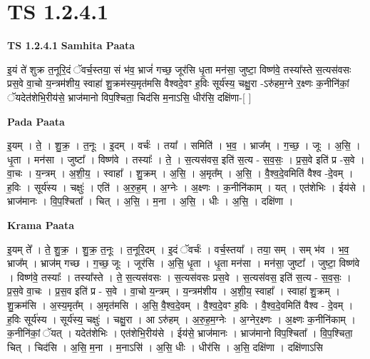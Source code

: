 \documentclass[17pt]{extarticle}
\begin{document}
\section*{ TS 1.2.4.1 }

\textbf{TS 1.2.4.1 } \newline
\textbf{Samhita Paata} \newline

इ॒यं ते॑ शुक्र त॒नूरि॒दं ॅवर्च॒स्तया॒ सं भ॑व॒ भ्राजं॑ गच्छ॒ जूर॑सि धृ॒ता मन॑सा॒ जुष्टा॒ विष्ण॑वे॒ तस्या᳚स्ते स॒त्यस॑वसः प्रस॒वे वा॒चो य॒न्त्रम॑शीय॒ स्वाहा॑ शु॒क्रम॑स्य॒मृत॑मसि वैश्वदे॒वꣳ ह॒विः सूर्य॑स्य॒ चक्षु॒रा -ऽरु॑हम॒ग्ने र॒क्ष्णः क॒नीनि॑कां॒ ॅयदेत॑शेभि॒रीय॑से॒ भ्राज॑मानो विप॒श्चिता॒ चिद॑सि म॒नाऽसि॒ धीर॑सि॒ दक्षि॑णा-[ ] \newline

\textbf{Pada Paata} \newline

इ॒यम् । ते॒ । शु॒क्र॒ । त॒नूः । इ॒दम् । वर्चः॑ । तया᳚ । समिति॑ । भ॒व॒ । भ्राज᳚म् । ग॒च्छ॒ । जूः । अ॒सि॒ । धृ॒ता । मन॑सा । जुष्टा᳚ । विष्ण॑वे । तस्याः᳚ । ते॒ । स॒त्यस॑वस॒ इति॑ स॒त्य - स॒व॒सः॒ । प्र॒स॒वे इति॑ प्र -स॒वे । वा॒चः । य॒न्त्रम् । अ॒शी॒य॒ । स्वाहा᳚ । शु॒क्रम् । अ॒सि॒ । अ॒मृत᳚म् । अ॒सि॒ । वै॒श्व॒दे॒वमिति॑ वैश्व -दे॒वम् । ह॒विः । सूर्य॑स्य । चक्षुः॑ । एति॑ । अ॒रु॒ह॒म् । अ॒ग्नेः । अ॒क्ष्णः । क॒नीनि॑काम् । यत् । एत॑शेभिः । ईय॑से । भ्राज॑मानः । वि॒प॒श्चिता᳚ । चित् । अ॒सि॒ । म॒ना । अ॒सि॒ । धीः । अ॒सि॒ । दक्षि॑णा ।  \newline


\textbf{Krama Paata} \newline

इ॒यम् ते᳚ । ते॒ शु॒क्र॒ । शु॒क्र॒ त॒नूः । त॒नूरि॒दम् । इ॒दं ॅवर्चः॑ । वर्च॒स्तया᳚ । तया॒ सम् । सम् भ॑व । भ॒व॒ भ्राज᳚म् । भ्राज॑म् गच्छ । ग॒च्छ॒ जूः । जूर॑सि । अ॒सि॒ धृ॒ता । धृ॒ता मन॑सा । मन॑सा॒ जुष्टा᳚ । जुष्टा॒ विष्ण॑वे । विष्ण॑वे॒ तस्याः᳚ । तस्या᳚स्ते । ते॒ स॒त्यस॑वसः । स॒त्यस॑वसः प्रस॒वे । स॒त्यस॑वस॒ इति॑ स॒त्य - स॒व॒सः॒ । प्र॒स॒वे वा॒चः । प्र॒स॒व इति॑ प्र - स॒वे । वा॒चो य॒न्त्रम् । य॒न्त्रम॑शीय । अ॒शी॒य॒ स्वाहा᳚ । स्वाहा॑ शु॒क्रम् । शु॒क्रम॑सि । अ॒स्य॒मृत᳚म् । अ॒मृत॑मसि । अ॒सि॒ वै॒श्व॒दे॒वम् । वै॒श्व॒दे॒वꣳ ह॒विः । वै॒श्व॒दे॒वमिति॑ वैश्व - दे॒वम् । ह॒विः सूर्य॑स्य । सूर्य॑स्य॒ चक्षुः॑ । चक्षु॒रा । आ ऽरु॑हम् । अ॒रु॒ह॒म॒ग्नेः । अ॒ग्नेर॒क्ष्णः । अ॒क्ष्णः क॒नीनि॑काम् । क॒नीनि॑कां॒ ॅयत् । यदेत॑शेभिः । एत॑शेभि॒रीय॑से । ईय॑से॒ भ्राज॑मानः । भ्राज॑मानो विप॒श्चिता᳚ । वि॒प॒श्चिता॒ चित् । चिद॑सि । अ॒सि॒ म॒ना । म॒नाऽसि॑ । अ॒सि॒ धीः । धीर॑सि । अ॒सि॒ दक्षि॑णा । दक्षि॑णाऽसि \newline
\end{document}
